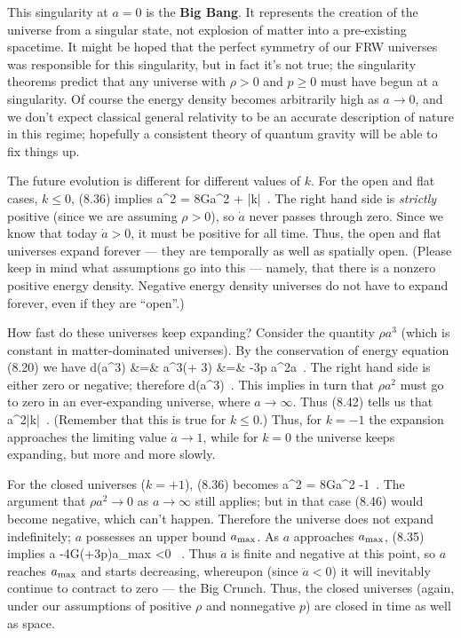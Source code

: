 \documentclass[12pt]{article}
\begin{document}
This singularity at $a=0$ is the {\bf Big Bang}.
It represents the creation of the universe from a singular state,
not explosion of matter into a pre-existing spacetime.  It might be
hoped that the perfect symmetry of our FRW universes was responsible
for this singularity, but in fact it's not true; the singularity
theorems predict that any universe with $\rho>0$ and $p\geq 0$ must
have begun at a singularity.  Of course
the energy density becomes arbitrarily high as $a\rightarrow 0$,
and we don't expect classical general relativity to be an
accurate description of nature in this regime; hopefully a 
consistent theory of quantum gravity will be able to fix things up.

The future evolution is different for different values of $k$.
For the open and flat cases, $k\leq 0$, (8.36) implies
\be
  \dot a^2 = {{8\pi G}}\rho a^2 + |k|\ .\label{8.42}
\ee
The right hand side is {\it strictly} positive (since we are
assuming $\rho>0$), so $\dot a$ never passes through zero.  Since
we know that today $\dot a>0$, it must be positive for all time.
Thus, the open and flat universes expand forever --- they are
temporally as well as spatially open.  (Please keep
in mind what assumptions go into this --- namely, that there
is a nonzero positive energy density.  Negative energy density
universes do not have to expand forever, even if they are ``open''.)

How fast do these universes keep expanding?  Consider the
quantity $\rho a^3$ (which is constant in matter-dominated
universes).  By the conservation of energy equation (8.20) we have
\bea
  {{d}}(\rho a^3) &=& 
  a^3\left(\dot\rho + 3\right)\cr
  &=&  -3p a^2\dot a\ .\label{8.43}
\eea
The right hand side is either zero or negative; therefore
\be
  {{d}}(\rho a^3)\ .\label{8.44}
\ee
This implies in turn that $\rho a^2$ must go to zero in an
ever-expanding universe, where $a\rightarrow\infty$.  Thus (8.42)
tells us that
\be
  \dot a^2\rightarrow |k|\ .\label{8.45}
\ee
(Remember that this is true for $k\leq 0$.)  Thus, for $k=-1$
the expansion approaches the limiting value $\dot a\rightarrow 1$,
while for $k=0$ the universe keeps expanding, but more and more slowly.

For the closed universes ($k=+1$), (8.36) becomes
\be
  \dot a^2 = {{8\pi G}}\rho a^2 -1\ .\label{8.46}
\ee
The argument that $\rho a^2\rightarrow 0$ as $a\rightarrow\infty$
still applies; but in that case (8.46) would become negative, which
can't happen.  Therefore the universe does not expand indefinitely;
$a$ possesses an upper bound $a_{\rm max}$.  As $a$ approaches
$a_{\rm max}$, (8.35) implies
\be
  \ddot a \rightarrow -{{4\pi G}}(\rho +3p)a_{\rm max} <0
  \ .\label{8.47}
\ee
Thus $\ddot a$ is finite and negative at this point, so $a$ reaches
$a_{\rm max}$ and starts decreasing, whereupon (since $\ddot a <0$)
it will inevitably continue to contract to zero --- the Big Crunch.
Thus, the closed universes (again, under our assumptions of
positive $\rho$ and nonnegative $p$) are closed in time as well
as space.
\end{document}
